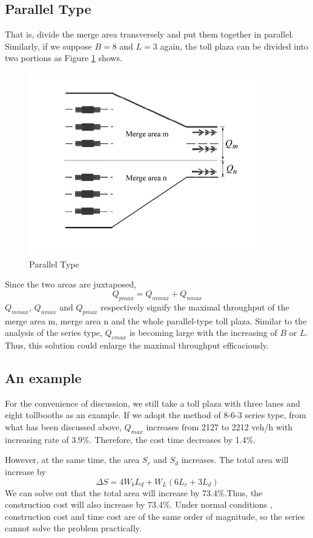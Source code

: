 \documentclass{mcmthesis}
\begin{document}
\subsection{Parallel Type}
That is, divide the merge area transversely and put
them together in parallel. Similarly, if we suppose
$B=8$ and $L=3$ again, the toll plaza can be divided into
two portions as Figure \ref{fig9} shows.
\begin{figure}[h]
\small
\centering
\includegraphics[width=10cm]{figure9}
\caption{Parallel Type}\label{fig9}
\end{figure}
Since the two areas are juxtaposed,
$$Q_{pmax}=Q_{mmax}+Q_{nmax}$$
$Q_{mmax}$, $Q_{nmax}$ and $Q_{pmax}$ respectively
signify the maximal throughput of the merge area m,
merge area n and the whole parallel-type toll plaza.
Similar to the analysis of the series type,
$Q_{emax}$ is becoming large with the increasing
of $B$ or $L$. Thus, this solution could enlarge
the maximal throughput efficaciously.

\subsection{An example}
For the convenience of discussion, we still take a
toll plaza with three lanes and eight tollbooths
as an example. If we adopt the method of 8-6-3 series
type, from what has been discussed above, $Q_{max}$
increases from 2127 to 2212 veh/h with increasing
rate of 3.9\%. Therefore, the cost time decreases
 by 1.4\%.


However, at the same time, the area $S_r$ and $S_d$
increases. The total area will increase by
$$\Delta S=4W_{b}L_{d}+W_{L}(6L_r+3L_d)$$
We can solve out that the total area will
increase by 73.4\%.Thus, the construction cost will
also increase by 73.4\%. Under normal conditions
, construction cost and time cost are of the
same order of magnitude, so the series cannot
solve the problem practically.
\end{document}
